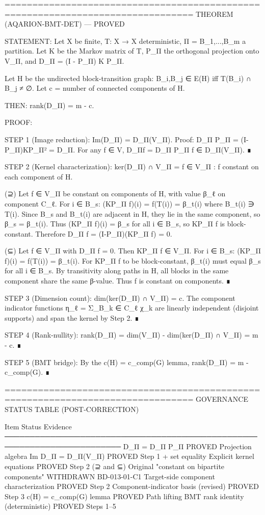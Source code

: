 ================================================================================
THEOREM (AQARION-BMT-DET) — PROVED

STATEMENT:
Let X be finite, T: X → X deterministic, Π = {B_1,...,B_m} a partition.
Let K be the Markov matrix of T, P_Π the orthogonal projection onto V_Π,
and D_Π = (I - P_Π) K P_Π.

Let H be the undirected block-transition graph: {B_i,B_j} ∈ E(H) iff
T(B_i) ∩ B_j ≠ ∅. Let c = number of connected components of H.

THEN: rank(D_Π) = m - c.

PROOF:

STEP 1 (Image reduction): Im(D_Π) = D_Π(V_Π).
Proof: D_Π P_Π = (I-P_Π)KP_Π² = D_Π. For any f ∈ V, D_Πf = D_Π P_Π f ∈ D_Π(V_Π).
∎

STEP 2 (Kernel characterization): ker(D_Π) ∩ V_Π = {f ∈ V_Π : f constant on each component of H}.

(⊇) Let f ∈ V_Π be constant on components of H, with value β_ℓ on component C_ℓ.
For i ∈ B_s: (KP_Π f)(i) = f(T(i)) = β_{t(i)} where B_{t(i)} ∋ T(i).
Since B_s and B_{t(i)} are adjacent in H, they lie in the same component,
so β_s = β_{t(i)}. Thus (KP_Π f)(i) = β_s for all i ∈ B_s, so KP_Π f is
block-constant. Therefore D_Π f = (I-P_Π)(KP_Π f) = 0.

(⊆) Let f ∈ V_Π with D_Π f = 0. Then KP_Π f ∈ V_Π.
For i ∈ B_s: (KP_Π f)(i) = f(T(i)) = β_{t(i)}.
For KP_Π f to be block-constant, β_{t(i)} must equal β_s for all i ∈ B_s.
By transitivity along paths in H, all blocks in the same component share
the same β-value. Thus f is constant on components.
∎

STEP 3 (Dimension count): dim(ker(D_Π) ∩ V_Π) = c.
The component indicator functions η_ℓ = Σ_{B_k ∈ C_ℓ} χ_k are linearly
independent (disjoint supports) and span the kernel by Step 2. ∎

STEP 4 (Rank-nullity): rank(D_Π) = dim(V_Π) - dim(ker(D_Π) ∩ V_Π) = m - c. ∎

STEP 5 (BMT bridge): By the c(H) = c_comp(G) lemma, rank(D_Π) = m - c_comp(G). ∎

================================================================================
GOVERNANCE STATUS TABLE (POST-CORRECTION)

Item                                          Status        Evidence
─────────────────────────────────────────────────────────────────────────
D_Π = D_Π P_Π                                 PROVED        Projection algebra
Im D_Π = D_Π(V_Π)                             PROVED        Step 1 + set equality
Explicit kernel equations                     PROVED        Step 2 (⊇ and ⊆)
Original "constant on bipartite components"   WITHDRAWN     BD-013-01-C1
Target-side component characterization        PROVED        Step 2
Component-indicator basis (revised)           PROVED        Step 3
c(H) = c_comp(G) lemma                        PROVED        Path lifting
BMT rank identity (deterministic)             PROVED        Steps 1–5

